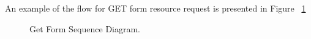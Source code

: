 An example of the flow for GET form resource request is presented in Figure ~\ref{fig:getForm_Sequence_Diagram}

\begin{figure}[h]
	\begin{center}
	\end{center}
	\caption{Get Form Sequence Diagram.}\label{fig:getForm_Sequence_Diagram}
\end{figure}






%




